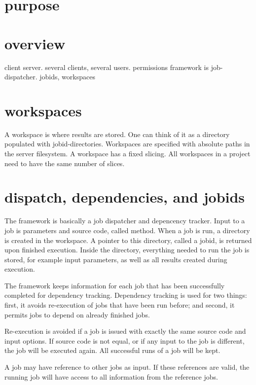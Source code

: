 
\section{purpose}




\section{overview}
client server.
several clients, several users.  permissions
framework is job-dispatcher.  jobids, workspaces





\section{workspaces}
A workspace is where results are stored.  One can think of it as a
directory populated with jobid-directories.
Workspaces are specified with absolute paths in the server filesystem.
A workspace has a fixed slicing.
All workspaces in a project need to have the same number of slices.



\section{dispatch, dependencies, and jobids}
The framework is basically a job dispatcher and depencency tracker.
Input to a job is parameters and source code, called method.  When a
job is run, a directory is created in the workspace.  A pointer to
this directory, called a jobid, is returned upon finished execution.
Inside the directory, everything needed to run the job is stored, for
example input parameters, as well as all results created during
execution.

The framework keeps information for each job that has been
successfully completed for dependency tracking.  Dependency tracking
is used for two things: first, it avoids re-execution of jobs that
have been run before; and second, it permits jobs to depend on already
finished jobs.

Re-execution is avoided if a job is issued with exactly the same
source code and input options.  If source code is not equal, or if any
input to the job is different, the job will be executed again.  All
successful runs of a job will be kept.

A job may have reference to other jobs as input.  If these references
are valid, the running job will have access to all information from
the reference jobs.



